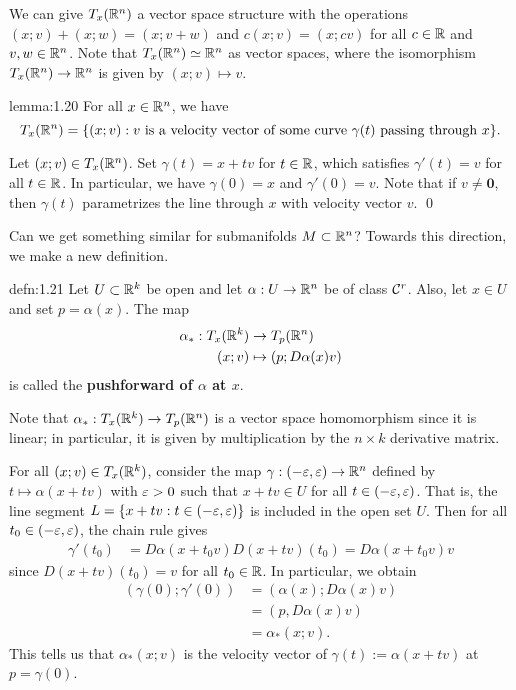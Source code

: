 We can give $T_x(\mathbb{R}^n)$ a vector space structure with the operations 
$(x; v) + (x; w) = (x; v+w)$ and $c(x; v) = (x; cv)$ for all 
$c \in \mathbb{R}$ and $v, w \in \mathbb{R}^n$. Note that $T_x(\mathbb{R}^n) \simeq \mathbb{R}^n$ as vector 
spaces, where the isomorphism $T_x(\mathbb{R}^n) \to \mathbb{R}^n$ is given by $(x; v) \mapsto v$. 

\begin{lemma}{lemma:1.20}
    For all $x \in \mathbb{R}^n$, we have 
    \[ T_x(\mathbb{R}^n) = \{(x; v) : v \text{ is a velocity vector of some 
    curve $\gamma(t)$ passing through $x$}\}. \] 
\end{lemma}\vspace{-0.25cm}
\begin{pf}
    Let $(x; v) \in T_x(\mathbb{R}^n)$. Set $\gamma(t) = x + tv$ for $t \in \mathbb{R}$, 
    which satisfies $\gamma'(t) = v$ for all $t \in \mathbb{R}$. In particular, we 
    have $\gamma(0) = x$ and $\gamma'(0) = v$. Note that if $v \neq \mathbf 0$, then 
    $\gamma(t)$ parametrizes the line through $x$ with velocity vector $v$. \qed 
\end{pf}\vspace{-0.25cm}

Can we get something similar for submanifolds $M \subset \mathbb{R}^n$? 
Towards this direction, we make a new definition. 

\begin{defn}{defn:1.21}
    Let $U \subset \mathbb{R}^k$ be open and let $\alpha : U \to \mathbb{R}^n$ be of class ${\cal C}^r$. 
    Also, let $x \in U$ and set $p = \alpha(x)$. The map 
    \begin{align*}
        \alpha_* : T_x(\mathbb{R}^k) &\to T_p(\mathbb{R}^n) \\ 
        (x; v) &\mapsto (p; D\alpha(x) v)
    \end{align*}
    is called the {\bf pushforward of $\alpha$ at $x$}. 
\end{defn}\vspace{-0.25cm}

Note that $\alpha_* : T_x(\mathbb{R}^k) \to T_p(\mathbb{R}^n)$ is a vector space homomorphism since it is linear; 
in particular, it is given by multiplication by the $n\times k$ derivative matrix. 

For all $(x; v) \in T_x(\mathbb{R}^k)$, consider the map $\gamma : (-\varepsilon, \varepsilon) \to \mathbb{R}^n$
defined by $t \mapsto \alpha(x+tv)$
with $\varepsilon > 0$ such that $x + tv \in U$ for all $t \in (-\varepsilon, \varepsilon)$. 
That is, the line segment $L = \{x + tv : t \in (-\varepsilon, \varepsilon)\}$
is included in the open set $U$. Then for all $t_0 \in (-\varepsilon, \varepsilon)$, 
the chain rule gives 
\begin{align*}
    \gamma'(t_0) &= D\alpha(x + t_0 v) D(x + tv)(t_0) 
    = D\alpha(x + t_0 v) v 
\end{align*}
since $D(x + tv)(t_0) = v$ for all $t_0 \in \mathbb{R}$. In particular, we obtain 
\begin{align*}
    (\gamma(0); \gamma'(0)) &= (\alpha(x); D\alpha(x)v) \\ 
    &= (p, D\alpha(x)v) \\ 
    &= \alpha_*(x; v). 
\end{align*}
This tells us that $\alpha_*(x; v)$ is the velocity vector of 
$\gamma(t) := \alpha(x + tv)$ at $p = \gamma(0)$.

